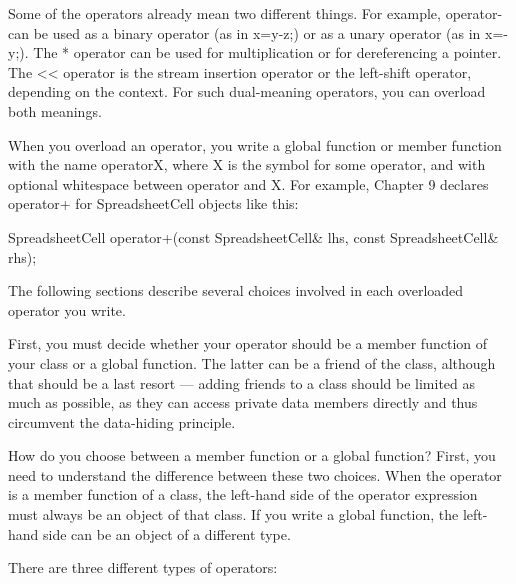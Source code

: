 Some of the operators already mean two different things. For example, operator- can be used as a binary operator (as in x=y-z;) or as a unary operator (as in x=-y;). The * operator can be used for multiplication or for dereferencing a pointer. The << operator is the stream insertion operator or the left-shift operator, depending on the context. For such dual-meaning operators, you can overload both meanings.


When you overload an operator, you write a global function or member function with the name operatorX, where X is the symbol for some operator, and with optional whitespace between operator and X. For example, Chapter 9 declares operator+ for SpreadsheetCell objects like this:

\begin{cpp}
SpreadsheetCell operator+(const SpreadsheetCell& lhs, const SpreadsheetCell& rhs);
\end{cpp}

The following sections describe several choices involved in each overloaded operator you write.


First, you must decide whether your operator should be a member function of your class or a global function. The latter can be a friend of the class, although that should be a last resort — adding friends to a class should be limited as much as possible, as they can access private data members directly and thus circumvent the data-hiding principle.

How do you choose between a member function or a global function? First, you need to understand the difference between these two choices. When the operator is a member function of a class, the left-hand side of the operator expression must always be an object of that class. If you write a global function, the left-hand side can be an object of a different type.

There are three different types of operators:

